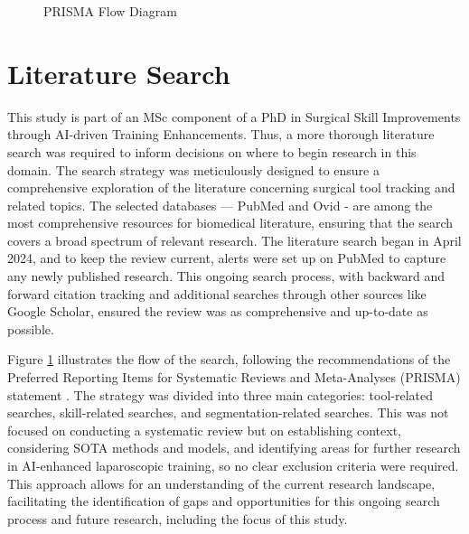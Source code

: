 \begin{figure}[htbp]
\begin{tikzpicture}[node distance=1.5cm, scale=0.65, every node/.style={transform shape, font=\fontsize{9}{10}\selectfont}]


    \end{tikzpicture}
    \caption{PRISMA Flow Diagram}
    \label{fig:prisma}
\end{figure}


\section{Literature Search}

This study is part of an MSc component of a PhD in Surgical Skill Improvements through AI-driven Training Enhancements. Thus, a more thorough literature search was required to inform decisions on where to begin research in this domain. The search strategy was meticulously designed to ensure a comprehensive exploration of the literature concerning surgical tool tracking and related topics. The selected databases — PubMed and Ovid - are among the most comprehensive resources for biomedical literature, ensuring that the search covers a broad spectrum of relevant research. The literature search began in April 2024, and to keep the review current, alerts were set up on PubMed to capture any newly published research. This ongoing search process, with backward and forward citation tracking and additional searches through other sources like Google Scholar, ensured the review was as comprehensive and up-to-date as possible.

Figure \ref{fig:prisma} illustrates the flow of the search, following the recommendations of the Preferred Reporting Items for Systematic Reviews and Meta-Analyses (PRISMA) statement \cite{moher_preferred_2010}. The strategy was divided into three main categories: tool-related searches, skill-related searches, and segmentation-related searches. This was not focused on conducting a systematic review but on establishing context, considering SOTA methods and models, and identifying areas for further research in AI-enhanced laparoscopic training, so no clear exclusion criteria were required. This approach allows for an understanding of the current research landscape, facilitating the identification of gaps and opportunities for this ongoing search process and future research, including the focus of this study.


